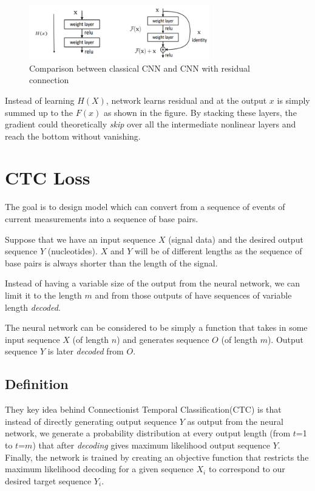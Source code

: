 \documentclass[times, utf8, diplomski, numeric, english]{fer}
\begin{document}
\begin{figure}[!ht]
	\begin{center}
		\includegraphics[width=0.7\textwidth]{./imgs/resnet_block.png}
		\caption[Comparison between classical CNN and CNN with residual connection ]{Comparison between classical CNN and CNN with residual connection \protect\footnotemark}
		\label{fg:resnet_block}
	\end{center}
\end{figure}
Instead of learning $H(X)$, network learns residual and at the output $x$ is simply summed up to the $F(x)$ as shown in the figure.  By stacking these layers, the gradient could theoretically \textit{skip} over all the intermediate nonlinear layers and reach the bottom without vanishing.




\section{CTC Loss}

The goal is to design model which can convert from a sequence of events of current measurements into a sequence of base pairs.

Suppose that we have an input sequence $X$ (signal data) and the desired output sequence $Y$ (nucleotides). $X$ and $Y$ will be of different lengths as the sequence of base pairs is always shorter than the length of the signal.

Instead of having a variable size of the output from the neural network, we can limit it to the length $m$ and from those outputs of 
have sequences of variable length \textit{decoded}.

The neural network can be considered to be simply a function that takes in some input sequence $X$ (of length $n$) and generates sequence $O$ (of length $m$). Output sequence $Y$ is later \textit{decoded} from $O$.

\subsection{Definition}
They key idea behind Connectionist Temporal Classification(CTC)\cite{Graves:2006:CTC:1143844.1143891} is that instead of directly generating output sequence $Y$ as output from the neural network, we  generate a probability distribution at every output length (from $t$=1 to $t$=$m$) that after \textit{decoding} gives maximum likelihood output sequence $Y$. 
Finally, the network is trained by creating an objective function that restricts the maximum likelihood decoding for a given sequence $X_i$ to correspond to our desired target sequence $Y_i$.
\end{document}
